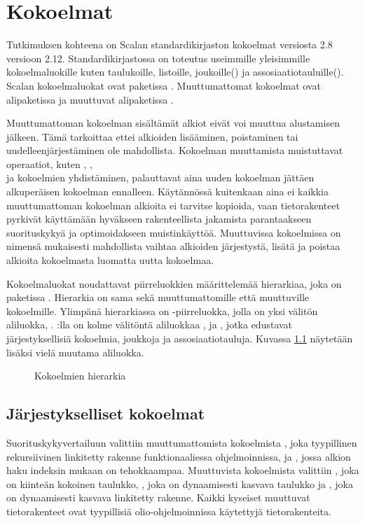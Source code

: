 \chapter{Kokoelmat} \label{Kokoelmat}
Tutkimuksen kohteena on Scalan standardikirjaston kokoelmat versiosta 2.8 versioon 2.12. Standardikirjastossa on toteutus useimmille yleisimmille kokoelmaluokille kuten taulukoille, listoille, joukoille() ja assosiaatiotauluille(). Scalan kokoelmaluokat ovat paketissa . Muuttumattomat kokoelmat ovat alipaketissa  ja muuttuvat alipaketissa .
\cite{scalaCollections}

Muuttumattoman kokoelman sisältämät alkiot eivät voi muuttua alustamisen jälkeen. Tämä tarkoittaa ettei alkioiden lisääminen, poistaminen tai uudelleenjärjestäminen ole mahdollista. Kokoelman muuttamista muistuttavat operaatiot, kuten , , \\ ja kokoelmien yhdistäminen, palauttavat aina uuden kokoelman jättäen alkuperäisen kokoelman ennalleen. Käytännössä kuitenkaan aina ei kaikkia muuttumattoman kokoelman alkioita ei tarvitse kopioida, vaan tietorakenteet pyrkivät käyttämään hyväkseen rakenteellista jakamista parantaakseen suorituskykyä ja optimoidakseen muistinkäyttöä. Muuttuvissa kokoelmissa on nimensä mukaisesti mahdollista vaihtaa alkioiden järjestystä, lisätä ja poistaa alkioita kokoelmasta luomatta uutta kokoelmaa.
\cite{scalaCollections}
\cite[Luku 22]{prorgrammingInScala3rd}

Kokoelmaluokat noudattavat piirreluokkien määrittelemää hierarkiaa, joka on paketissa . Hierarkia on sama sekä muuttumattomille että muuttuville kokoelmille. Ylimpänä hierarkiassa on -piirreluokka, jolla on yksi välitön aliluokka, . :lla on kolme välitöntä aliluokkaa ,  ja , jotka edustavat järjestyksellisiä kokoelmia, joukkoja ja assosiaatiotauluja. Kuvassa \ref{kokoelmahierarkia} näytetään lisäksi vielä muutama aliluokka.
\cite{scalaCollections}
\begin{figure}[h]
    \centering
    \caption{Kokoelmien hierarkia}\label{kokoelmahierarkia}
\end{figure}


\section{Järjestykselliset kokoelmat}
Suorituskykyvertailuun valittiin muuttumattomista kokoelmista , joka tyypillinen rekursiivinen linkitetty rakenne funktionaaliessa ohjelmoinnissa, ja , jossa alkion haku indeksin mukaan on tehokkaampaa. Muuttuvista kokoelmista valittiin , joka on kiinteän kokoinen taulukko, , joka on dynaamisesti kasvava taulukko ja , joka on dynaamisesti kasvava linkitetty rakenne. Kaikki kyseiset muuttuvat tietorakenteet ovat tyypillisiä olio-ohjelmoinnissa käytettyjä tietorakenteita.

